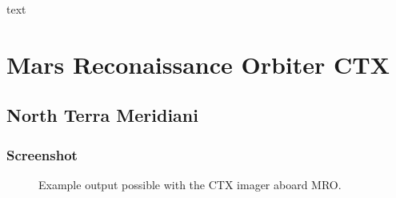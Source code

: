 text

\section{Mars Reconaissance Orbiter CTX}

\subsection{North Terra Meridiani}

\subsubsection*{Screenshot}

\begin{figure}[h!]
\centering
  \hfil
\caption{Example output possible with the CTX imager aboard MRO.}
\label{fig:ctx_example}
\end{figure}

